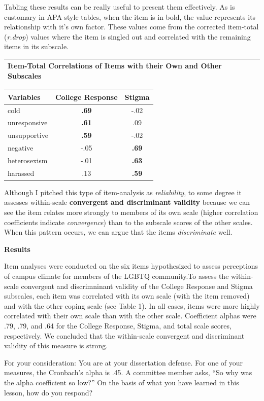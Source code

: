 \documentclass[
  english,
]{book}
\begin{document}
Tabling these results can be really useful to present them effectively. As is customary in APA style tables, when the item is in bold, the value represents its relationship with it's own factor. These values come from the corrected item-total (\emph{r.drop}) values where the item is singled out and correlated with the remaining items in its subscale.

\begin{longtable}[]{@{}l@{}}
\toprule
Item-Total Correlations of Items with their Own and Other Subscales\tabularnewline
\midrule
\endhead
\bottomrule
\end{longtable}

\begin{longtable}[]{@{}lcc@{}}
\toprule
Variables & College Response & Stigma\tabularnewline
\midrule
\endhead
cold & \textbf{.69} & -.02\tabularnewline
unresponsive & \textbf{.61} & .09\tabularnewline
unsupportive & \textbf{.59} & -.02\tabularnewline
negative & -.05 & \textbf{.69}\tabularnewline
heterosexism & -.01 & \textbf{.63}\tabularnewline
harassed & .13 & \textbf{.59}\tabularnewline
\bottomrule
\end{longtable}

Although I pitched this type of item-analysis as \emph{reliability}, to some degree it assesses within-scale \textbf{convergent and discriminant validity} because we can see the item relates more strongly to members of its own scale (higher correlation coefficients indicate \emph{convergence}) than to the subscale scores of the other scales. When this pattern occurs, we can argue that the items \emph{discriminate} well.

\textbf{Results}

Item analyses were conducted on the six items hypothesized to assess perceptions of campus climate for members of the LGBTQ community.To assess the within-scale convergent and discrimninant validity of the College Response and Stigma subscales, each item was correlated with its own scale (with the item removed) and with the other coping scale (see Table 1). In all cases, items were more highly correlated with their own scale than with the other scale. Coefficient alphas were .79, .79, and .64 for the College Response, Stigma, and total scale scores, respectively. We concluded that the within-scale convergent and discriminant validity of this measure is strong.

For your consideration:
You are at your dissertation defense. For one of your measures, the Cronbach's alpha is .45. A committee member asks, ``So why was the alpha coefficient so low?'' On the basis of what you have learned in this lesson, how do you respond?
\end{document}
